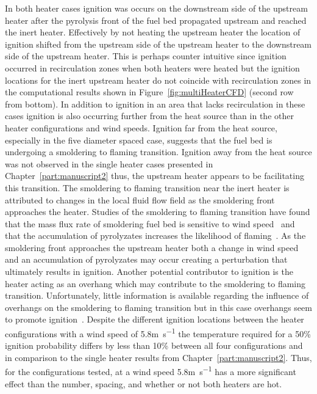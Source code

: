    In both heater cases ignition was occurs on the downstream side of the upstream heater after the pyrolysis front of the fuel bed propagated upstream and reached the inert heater. Effectively by not heating the upstream heater the location of ignition shifted from the upstream side of the upstream heater to the downstream side of the upstream heater. This is perhaps counter intuitive since ignition occurred in recirculation zones when both heaters were heated but the ignition locations for the inert upstream heater do not coincide with recirculation zones in the computational results shown in Figure~\ref{fig:multiHeaterCFD} (second row from bottom). In addition to ignition in an area that lacks recirculation in these cases ignition is also occurring further from the heat source than in the other heater configurations and wind speeds. Ignition far from the heat source, especially in the five diameter spaced case, suggests that the fuel bed is undergoing a smoldering to flaming transition. Ignition away from the heat source was not observed in the single heater cases presented in Chapter~\ref{part:manuscript2} thus, the upstream heater appears to be facilitating this transition. The smoldering to flaming transition near the inert heater is attributed to changes in the local fluid flow field as the smoldering front approaches the heater. Studies of the smoldering to flaming transition have found that the mass flux rate of smoldering fuel bed is sensitive to wind speed~\cite{Ohlemiller1990} and that the accumulation of pyrolyzates increases the likelihood of flaming~\cite{Stoliarov}. As the smoldering front approaches the upstream heater both a change in wind speed and an accumulation of pyrolyzates may occur creating a perturbation that ultimately results in ignition. Another potential contributor to ignition is the heater acting as an overhang which may contribute to the smoldering to flaming transition. Unfortunately, little information is available regarding the influence of overhangs on the smoldering to flaming transition but in this case overhangs seem to promote ignition~\cite{Santoso2019}. Despite the different ignition locations between the heater configurations with a wind speed of 5.8\si{\meter\per\second} the temperature required for a 50\% ignition probability differs by less than 10\% between all four configurations and in comparison to the single heater results from Chapter~\ref{part:manuscript2}. Thus, for the configurations tested, at a wind speed 5.8\si{\meter\per\second} has a more significant effect than the number, spacing, and whether or not both heaters are hot.
    

